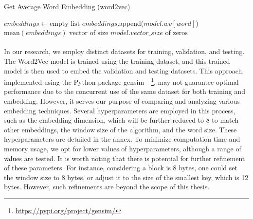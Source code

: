         \begin{algorithm}
            \caption{Get Average Word Embedding (word2vec)}
            \label{algo:embedding:generate_sentence_embedding_word2vec}
            \begin{algorithmic}[1]
             
                \State $embeddings \gets \text{empty list}$
                        \State $embeddings$.append($model.wv[word]$)
                    \EndIf
                \EndFor
                    \State \Return $\text{mean}(embeddings)$ 
                \Else
                    \State \Return $\text{vector of size } model.vector\_size \text{ of zeros}$
                \EndIf
            \EndFunction
            \end{algorithmic}
        \end{algorithm}
            
        
        \paragraph{}In our research, we employ distinct datasets for training, validation, and testing. The Word2Vec model is trained using the training dataset, and this trained model is then used to embed the validation and testing datasets. This approach, implemented using the Python package gensim~\cite{rehurek_software_2010}~\footnote{\url{https://pypi.org/project/gensim/}}, may not guarantee optimal performance due to the concurrent use of the same dataset for both training and embedding. However, it serves our purpose of comparing and analyzing various embedding techniques. Several hyperparameters are employed in this process, such as the embedding dimension, which will be further reduced to 8 to match other embeddings, the window size of the algorithm, and the word size. These hyperparameters are detailed in the annex. To minimize computation time and memory usage, we opt for lower values of hyperparameters, although a range of values are tested. It is worth noting that there is potential for further refinement of these parameters. For instance, considering a block is 8 bytes, one could set the window size to 8 bytes, or adjust it to the size of the smallest key, which is 12 bytes. However, such refinements are beyond the scope of this thesis.

